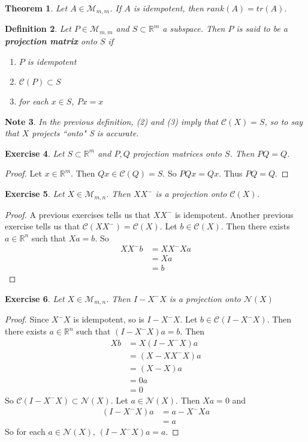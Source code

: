 \documentclass[12pt]{amsart}
\newtheorem{thm}{Theorem}[section]
\newtheorem{defn}[thm]{Definition}
\newtheorem{note}[thm]{Note}
\newtheorem{ex}[thm]{Exercise}
\newcommand{\R}{\mathbb{R}}
\newcommand{\MC}{\mathcal{C}}
\newcommand{\MN}{\mathcal{N}}
\newcommand{\MM}{\mathcal{M}}
\newcommand{\z}[1]{Let ${#1} \in \MM_{m,n}$}
\begin{document}
\begin{thm}
Let $A \in \MM_{m,m}$. If $A$ is idempotent, then $rank(A) = tr(A)$.
\end{thm}

\begin{defn}
Let $P \in \MM_{m,m}$ and $S \subset \R^m$ a subspace. Then $P$ is said to be a \textbf{projection matrix} onto $S$ if 
\begin{enumerate}
\item $P$ is idempotent
\item $\MC(P) \subset S$ 
\item for each $x \in S$, $Px = x$
\end{enumerate} 
\end{defn}

\begin{note}
In the previous definition, (2) and (3) imply that $\MC(X) = S$, so to say that $X$ projects ``onto" S is accurate.
\end{note}

\begin{ex}
Let $S \subset \R^m$ and $P,Q$ projection matrices onto $S$. Then $PQ = Q$. 
\end{ex}

\begin{proof}
Let $x \in \R^m$. Then $Qx \in \MC(Q) = S$. So $PQx = Qx$. Thus $PQ = Q$.
\end{proof}

\begin{ex}
\z{X}. Then $XX^-$ is a projection onto $\MC(X)$.
\end{ex}

\begin{proof}
A previous exercises tells us that $XX^-$ is idempotent. Another previous exercise tells us that $\MC(XX^-) = \MC(X)$. Let $b \in \MC(X)$. Then there exists $a \in \R^n$ such that $Xa =b$. So 
\begin{align*}
XX^-b
&= XX^- Xa\\ 
&= Xa\\
&= b
\end{align*}
\end{proof}

\begin{ex}
\z{X}. Then $I-X^-X$ is a projection onto $\MN(X)$
\end{ex}

\begin{proof}
Since $X^-X$ is idempotent, so is $I-X^-X$. Let $b \in \MC(I-X^-X)$. Then there exists $a \in \R^n$ such that $(I-X^-X)a = b$. Then 
\begin{align*}
Xb 
&= X(I-X^-X)a \\
&= (X-XX^-X)a \\
&= (X-X)a \\
&= 0a \\ 
&= 0
\end{align*}
So $\MC(I-X^-X) \subset \MN(X)$. Let $a \in \MN(X)$. Then $Xa =0$ and 
\begin{align*}
(I-X^-X)a 
&= a - X^-Xa \\
&= a
\end{align*} 
So for each $a \in \MN(X)$, $(I-X^-X)a = a$.
\end{proof}
\end{document}
